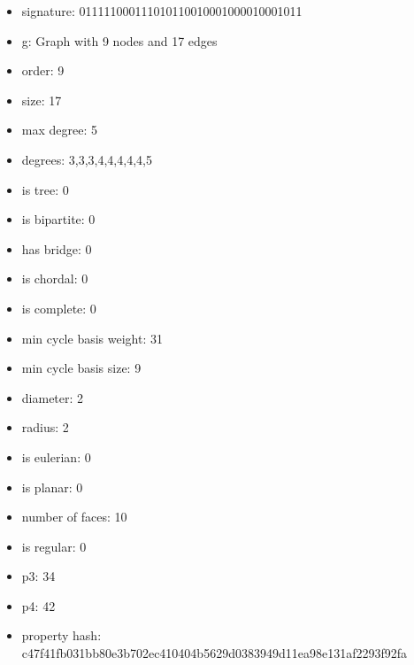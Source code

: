 \newpage
\begin{figure}
\end{figure}
\begin{itemize}
\item signature: 011111000111010110010001000010001011
\item g: Graph with 9 nodes and 17 edges
\item order: 9
\item size: 17
\item max degree: 5
\item degrees: 3,3,3,4,4,4,4,4,5
\item is tree: 0
\item is bipartite: 0
\item has bridge: 0
\item is chordal: 0
\item is complete: 0
\item min cycle basis weight: 31
\item min cycle basis size: 9
\item diameter: 2
\item radius: 2
\item is eulerian: 0
\item is planar: 0
\item number of faces: 10
\item is regular: 0
\item p3: 34
\item p4: 42
\item property hash: c47f41fb031bb80e3b702ec410404b5629d0383949d11ea98e131af2293f92fa
\end{itemize}
